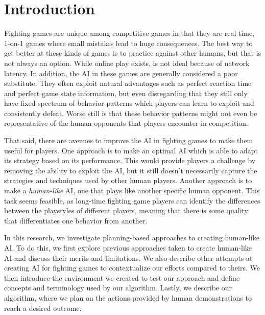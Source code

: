 
\chapter{Introduction} %

\label{Chapter1} %


\newcommand{\keyword}[1]{\textbf{#1}}
\newcommand{\tabhead}[1]{\textbf{#1}}
\newcommand{\code}[1]{\texttt{#1}}
\newcommand{\file}[1]{\texttt{\bfseries#1}}
\newcommand{\option}[1]{\texttt{\itshape#1}}



Fighting games are unique among competitive games in that they are real-time, 1-on-1 games where small mistakes lead to huge consequences. The best way to get better at these kinds of games is to practice against other humans, but that is not always an option. While online play exists, is not ideal because of network latency. In addition, the AI in these games are generally considered a poor substitute. They often exploit natural advantages such as perfect reaction time and perfect game state information, but even disregarding that they still only have fixed spectrum of behavior patterns which players can learn to exploit and consistently defeat. Worse still is that these behavior patterns might not even be representative of the human opponents that players encounter in competition.

That said, there are avenues to improve the AI in fighting games to make them useful for players. One approach is to make an optimal AI which is able to adapt its strategy based on its performance. This would provide players a challenge by removing the ability to exploit the AI, but it still doesn't necessarily capture the strategies and techniques used by other human players. Another approach is to make a \textit{human-like} AI, one that plays like another specific human opponent. This task seems feasible, as long-time fighting game players can identify the differences between the playstyles of different players, meaning that there is some quality that differentiates one behavior from another.

In this research, we investigate planning-based approaches to creating human-like AI. To do this, we first explore previous approaches taken to create human-like AI and discuss their merits and limitations. We also describe other attempts at creating AI for fighting games to contextualize our efforts compared to theirs. We then introduce the environment we created to test our approach and define concepts and terminology used by our algorithm. Lastly, we describe our algorithm, where we plan on the actions provided by human demonstrations to reach a desired outcome.


